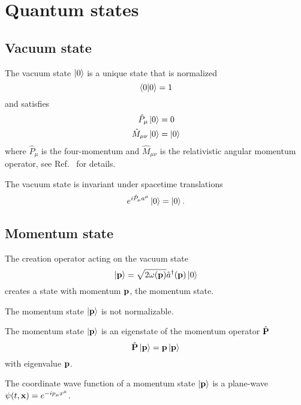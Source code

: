 \section{Quantum states}

\subsection{Vacuum state}

\begin{definition}
	The vacuum state $\ket{0}$ is a unique state that is normalized
	\begin{equation}
		\braket{0}
		=
		1
	\end{equation}
	and satisfies
	\begin{align}
		\hat{P}_\mu
		\ket{0}
		&=
		0
		\\
		\hat{M}_{\mu\nu}
		\ket{0}
		&=
		\ket{0}
	\end{align}
	where $\hat{P}_\mu$ is the four-momentum and $\hat{M}_{\mu\nu}$ is the relativistic angular momentum operator, see Ref.~\cite[p.~270]{Greiner2013} for details.
\end{definition}
\begin{corollary}
	The vacuum state is invariant under spacetime translations
	\begin{equation}
		e^{i\hat{P}_\mu a^\mu}
		\ket{0}
		=
		\ket{0}
		.
	\end{equation}	
\end{corollary}

\subsection{Momentum state}

\begin{definition}
	The creation operator acting on the vacuum state
	\begin{equation}
		\ket{\vb{p}}
		=
		\sqrt{2\omega(\vb{p})}
		\hat{a}^\dagger(\vb{p})
		\ket{0}
	\end{equation}
	creates a state with momentum $\vb{p}$, the momentum state.
\end{definition}
\begin{lemma}\label{thm:momentum_state_non_normalizable}
	The momentum state $\ket{\vb{p}}$ is not normalizable.
\end{lemma}
\begin{theorem}\label{thm:momentum_state_eigenstate}
	The momentum state $\ket{\vb{p}}$ is an eigenstate of the momentum operator $\hat{\vb{P}}$
	\begin{equation}
		\hat{\vb{P}}
		\ket{\vb{p}}
		=
		\vb{p}
		\ket{\vb{p}}
	\end{equation}
	with eigenvalue $\vb{p}$.
\end{theorem}
\begin{lemma}\label{thm:momentum_state_wave_function}
	The coordinate wave function of a momentum state $\ket{\vb{p}}$ is a plane-wave $\psi(t,\vb{x})=e^{-ip_\mu x^\mu}$.
\end{lemma}

